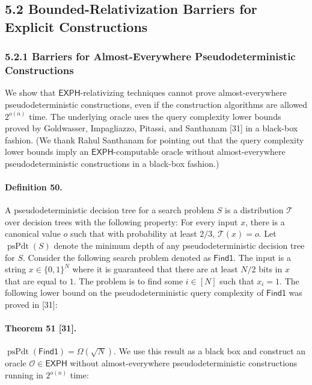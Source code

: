 \subsection*{5.2 Bounded-Relativization Barriers for Explicit Constructions}
\subsubsection*{5.2.1 Barriers for Almost-Everywhere Pseudodeterministic Constructions}
We show that $\mathsf{EXPH}$-relativizing techniques cannot prove almost-everywhere pseudodeterministic constructions, even if the construction algorithms are allowed $2^{o(n)}$ time. The underlying oracle uses the query complexity lower bounds proved by Goldwasser, Impagliazzo, Pitassi, and Santhanam [31] in a black-box fashion. (We thank Rahul Santhanam for pointing out that the query complexity lower bounds imply an $\mathsf{EXPH}$-computable oracle without almost-everywhere pseudodeterministic constructions in a black-box fashion.)
\paragraph{Definition 50.} A pseudodeterministic decision tree for a search problem $S$ is a distribution $\mathcal T$ over decision trees with the following property: For every input $x$, there is a canonical value $o$ such that with probability at least $2/3$, $\mathcal T(x)=o$. Let $\operatorname{psPdt}(S)$ denote the minimum depth of any pseudodeterministic decision tree for $S$.
Consider the following search problem denoted as $\mathsf{Find1}$. The input is a string $x\in\{0,1\}^N$ where it is guaranteed that there are at least $N/2$ bits in $x$ that are equal to $1$. The problem is to find some $i\in[N]$ such that $x_i=1$. The following lower bound on the pseudodeterministic query complexity of $\mathsf{Find1}$ was proved in [31]:
\paragraph{Theorem 51 [31].} $\operatorname{psPdt}(\mathsf{Find1})=\Omega(\sqrt N)$.
We use this result as a black box and construct an oracle $\mathcal O\in\mathsf{EXPH}$ without almost-everywhere pseudodeterministic constructions running in $2^{o(n)}$ time:
